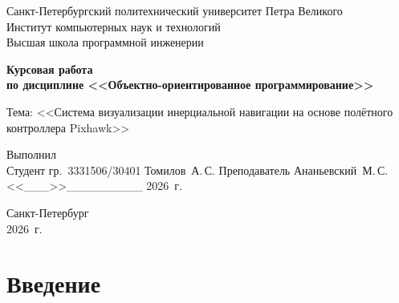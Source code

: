 
 
\usepackage{amssymb}
\usepackage{bm}
\usepackage{mathtools}
\usepackage{cite}
\usepackage{setspace}
 
\lstset{
    basicstyle        = \ttfamily\small,
    numbers           = left,
    numbersep         = 5pt,
    tabsize           = 4,
    showstringspaces  = false,
    keepspaces        = true,
    breaklines        = true,
    frame             = single,
    captionpos        = b,
    language          = C++
}
 
\setlength{\tabcolsep}{6pt}
 

\linespread{1.5}\selectfont
 
\thispagestyle{empty}
\begin{center}
  Санкт-Петербургский политехнический университет Петра Великого\\[2pt]
  Институт компьютерных наук и технологий\\[2pt]
  Высшая школа программной инженерии
\end{center}
 
\vfill
 
\begin{center}
  \textbf{Курсовая работа}\\[4pt]
  \textbf{по дисциплине <<Объектно-ориентированное программирование>>}
\end{center}
 
\vskip8mm
Тема: <<Система визуализации инерциальной навигации на основе
полётного контроллера Pixhawk>>
\vskip10mm
 
Выполнил\\
Студент гр.~3331506/30401 \hfill Томилов~А.\,С.
\vskip8mm
Преподаватель \hfill Ананьевский~М.\,С.
\vskip10mm
\hfill <<\_\_\_>>\_\_\_\_\_\_\_\_\_ 2026~г.
 
\vfill
\begin{center}
  Санкт-Петербург\\
  2026~г.
\end{center}
\newpage
 
\tableofcontents
\newpage
 
\section*{Введение}
 
